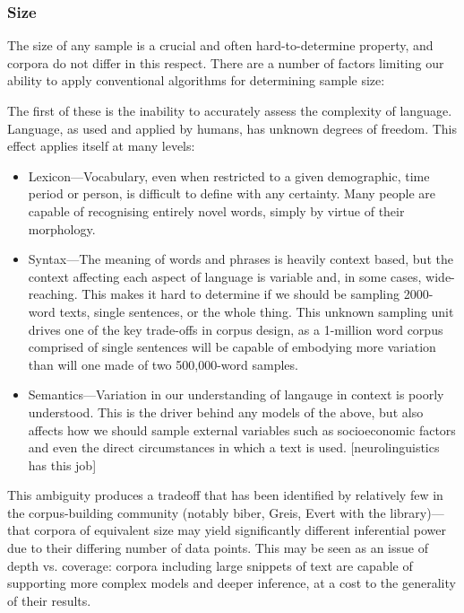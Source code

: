 \subsubsection{Size}
The size of any sample is a crucial and often hard-to-determine property, and corpora do not differ in this respect.  There are a number of factors limiting our ability to apply conventional algorithms for determining sample size:

The first of these is the inability to accurately assess the complexity of language.  Language, as used and applied by humans, has unknown degrees of freedom.  This effect applies itself at many levels:

\begin{itemize}
    \item Lexicon---Vocabulary, even when restricted to a given demographic, time period or person, is difficult to define with any certainty.  Many people are capable of recognising entirely novel words, simply by virtue of their morphology.
    \item Syntax---The meaning of words and phrases is heavily context based, but the context affecting each aspect of language is variable and, in some cases, wide-reaching.  This makes it hard to determine if we should be sampling 2000-word texts, single sentences, or the whole thing.  This unknown sampling unit drives one of the key trade-offs in corpus design, as a 1-million word corpus comprised of single sentences will be capable of embodying more variation than will one made of two 500,000-word samples.
    \item Semantics---Variation in our understanding of langauge in context is poorly understood.  This is the driver behind any models of the above, but also affects how we should sample external variables such as socioeconomic factors and even the direct circumstances in which a text is used.  [neurolinguistics has this job]
\end{itemize}

This ambiguity produces a tradeoff that has been identified by relatively few in the corpus-building community (notably biber, Greis, Evert with the library)---that corpora of equivalent size may yield significantly different inferential power due to their differing number of data points.  This may be seen as an issue of depth vs. coverage: corpora including large snippets of text are capable of supporting more complex models and deeper inference, at a cost to the generality of their results.

